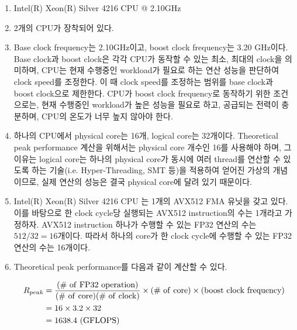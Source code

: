 \begin{enumerate}[label= (\alph*)]

    \item {Intel(R) Xeon(R) Silver 4216 CPU @ 2.10GHz}
    \item {2개의 CPU가 장착되어 있다.}
    \item {
        Base clock frequency는 2.10GHz이고, boost clock frequency는 3.20 GHz이다.
        Base clock과 boost clock은 각각 CPU가 동작할 수 있는 최소, 최대의 clock을 의미하며,
        CPU는 현재 수행중인 workload가 필요로 하는 연산 성능을 판단하여 clock speed를 조정한다.
        이 때 clock speed를 조정하는 범위를 base clock과 boost clock으로 제한한다.
        CPU가 boost clock frequency로 동작하기 위한 조건으로는, 현재 수행중인 workload가 높은 성능을 필요로 하고,
        공급되는 전력이 충분하며, CPU의 온도가 너무 높지 않아야 한다.
    }
    \item {
        하나의 CPU에서 physical core는 16개, logical core는 32개이다.
        Theoretical peak performance 계산을 위해서는 physical core 개수인 16를 사용해야 하며,
        그 이유는 logical core는 하나의 physical core가 동시에 여러 thread를 연산할 수 있도록 하는
        기술(i.e. Hyper-Threading, SMT 등)을 적용하여 얻어진 가상의 개념이므로,
        실제 연산의 성능은 결국 physical core에 달려 있기 때문이다.
        
    }
    \item {
        Intel(R) Xeon(R) Silver 4216 CPU 는 1개의 AVX512 FMA 유닛을 갖고 있다.
        이를 바탕으로 한 clock cycle당 실행되는 AVX512 instruction의 수는 1개라고 가정하자.
        AVX512 instruction 하나가 수행할 수 있는 FP32 연산의 수는 $512/32=16$개이다.
        따라서 하나의 core가 한 clock cycle에 수행할 수 있는 FP32 연산의 수는 16개이다.
    }
    \item {
        Theoretical peak performance를 다음과 같이 계산할 수 있다.
        
        \begin{align}
            R_{peak}
            & =     \mathrm{\frac{(\#~of~FP32~operation)}{(\#~of~core)(\#~of~clock)}}
            \times  \mathrm{(\#~of~core)}
            \times  \mathrm{(boost~clock~frequency)} \notag \\
            & = 16 \times 3.2 \times 32 \notag \\
            & = {1638.4}~\mathrm{(GFLOPS)} \notag
        \end{align}
    
    }
    
\end{enumerate}